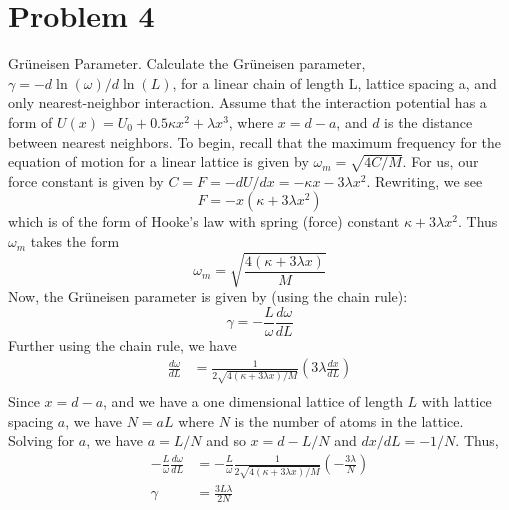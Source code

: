 \documentclass{article}
\begin{document}
\section*{Problem 4}
Gr{\"u}neisen Parameter. Calculate the Gr{\"u}neisen parameter, $\gamma = -d\ln{(\omega)}/d\ln{(L)}$, for a linear chain of length L, lattice spacing a, and only nearest-neighbor interaction. Assume that the interaction potential has a form of $U(x) = U_0 + 0.5\kappa x^2 + \lambda x^3$, where $x = d - a$, and $d$ is the distance between nearest neighbors.
\newline\newline
To begin, recall that the maximum frequency for the equation of motion for a linear lattice is given by $\omega_m = \sqrt{4C/M}$. For us, our force constant is given by $C = F = -dU/dx = -\kappa x - 3\lambda x^2$. Rewriting, we see
\[F = -x(\kappa + 3\lambda x^2)\]
which is of the form of Hooke's law with spring (force) constant $\kappa + 3\lambda x^2$. Thus $\omega_m$ takes the form
\[\omega_m = \sqrt{\frac{4(\kappa + 3\lambda x)}{M}}\]
Now, the Gr{\"u}neisen parameter is given by (using the chain rule):
\[\gamma = -\frac{L}{\omega}\frac{d\omega}{dL}\]
Further using the chain rule, we have 
\begin{align*}
    \frac{d\omega}{dL} &= \frac{1}{2\sqrt{4(\kappa + 3\lambda x)/M}}\left(3\lambda \frac{dx}{dL}\right) \\
\end{align*}
Since $x = d - a$, and we have a one dimensional lattice of length $L$ with lattice spacing $a$, we have $N = aL$ where $N$ is the number of atoms in the lattice. Solving for $a$, we have $a = L/N$ and so $x = d - L/N$ and $dx/dL = -1/N$. Thus,
\begin{align*}
    -\frac{L}{\omega}\frac{d\omega}{dL} &=  -\frac{L}{\omega}\frac{1}{2\sqrt{4(\kappa + 3\lambda x)/M}}\left(-\frac{3\lambda}{N}\right)\\
    \gamma &= \frac{3L\lambda}{2N} \\
\end{align*}
\end{document}
